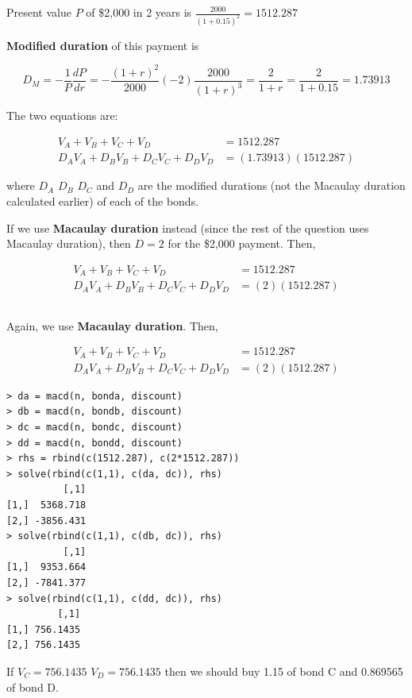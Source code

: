\documentclass[11pt]{scrartcl}
\begin{document}
Present value $P$ of \$2,000 in 2 years is $\frac{2000}{(1+0.15)^2} = 1512.287$

\textbf{Modified duration} of this payment is

\[D_M = -\frac{1}{P}\frac{dP}{dr} = - \frac{(1+r)^2}{2000}(-2)\frac{2000}{(1+r)^3} = \frac{2}{1+r} = \frac{2}{1 + 0.15} = 1.73913\]

The two equations are:

\begin{align*}
V_A + V_B + V_C + V_D &= 1512.287 \\
D_A V_A + D_BV_B + D_CV_C + D_DV_D &= (1.73913)(1512.287)
\end{align*}

where $D_A$ $D_B$ $D_C$ and $D_D$ are the modified durations (not the Macaulay duration calculated earlier) of each of the bonds.

If we use \textbf{Macaulay duration} instead (since the rest of the question uses Macaulay duration), then $D = 2$ for the \$2,000 payment. Then,

\begin{align*}
V_A + V_B + V_C + V_D &= 1512.287 \\
D_A V_A + D_BV_B + D_CV_C + D_DV_D &= (2)(1512.287)
\end{align*}

\subsection{}

Again, we use \textbf{Macaulay duration}. Then,

\begin{align*}
V_A + V_B + V_C + V_D &= 1512.287 \\
D_A V_A + D_BV_B + D_CV_C + D_DV_D &= (2)(1512.287)
\end{align*}

\begin{lstlisting}
> da = macd(n, bonda, discount)
> db = macd(n, bondb, discount)
> dc = macd(n, bondc, discount)
> dd = macd(n, bondd, discount)
> rhs = rbind(c(1512.287), c(2*1512.287))
> solve(rbind(c(1,1), c(da, dc)), rhs)
          [,1]
[1,]  5368.718
[2,] -3856.431
> solve(rbind(c(1,1), c(db, dc)), rhs)
          [,1]
[1,]  9353.664
[2,] -7841.377
> solve(rbind(c(1,1), c(dd, dc)), rhs)
         [,1]
[1,] 756.1435
[2,] 756.1435
\end{lstlisting}

If $V_C = 756.1435$ $V_D = 756.1435$ then we should buy 1.15 of bond C and 0.869565 of bond D.
\end{document}
